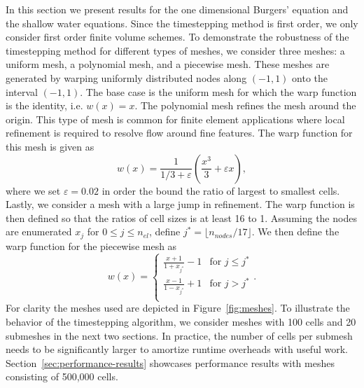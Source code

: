 In this section we present results for the one dimensional Burgers' equation and the shallow water equations. Since the timestepping method is first order, we only consider first order finite volume schemes.
To demonstrate the robustness of the timestepping method for different types of meshes, we consider three meshes: a uniform mesh, a polynomial mesh, and a piecewise mesh. These meshes are generated by warping uniformly distributed nodes along $(-1,1)$ onto the interval $(-1,1)$. The base case is the uniform mesh for which the warp function is the identity, i.e. $w(x) = x$. The polynomial mesh refines the mesh around the origin. This type of mesh is common for finite element applications where local refinement is required to resolve flow around fine features. The warp function for this mesh is given as
\begin{equation*}
  w(x) = \frac{1}{1/3 + \varepsilon} \left( \frac{ x^3}{3} + \varepsilon x \right),
\end{equation*}
where we set $\varepsilon = 0.02$ in order the bound the ratio of largest to smallest cells. Lastly, we consider a mesh with a large jump in refinement. The warp function is then defined so that the ratios of cell sizes is at least 16 to 1. Assuming the nodes are enumerated $x_{j}$ for $0 \le j \le n_{el}$, define $j^*  = \lfloor n_{nodes}/17 \rfloor$. We then define the warp function for the piecewise mesh as
\begin{equation*}
  w(x) = \begin{cases}
    \frac{x + 1}{1 + x_{j^*}} - 1 & \text{for } j \le j^*\\
    \frac{x - 1}{1 - x_{j^*}} + 1 & \text{for } j > j^*\\
    \end{cases}.
\end{equation*}
For clarity the meshes used are depicted in Figure~\ref{fig:meshes}. To illustrate the behavior of the timestepping algorithm, we consider meshes with 100 cells and 20 submeshes in the next two sections.  In practice, the number of cells per submesh needs to be significantly larger to amortize runtime overheads with useful work. Section~\ref{sec:performance-results} showcases performance results with meshes consisting of 500,000 cells.




